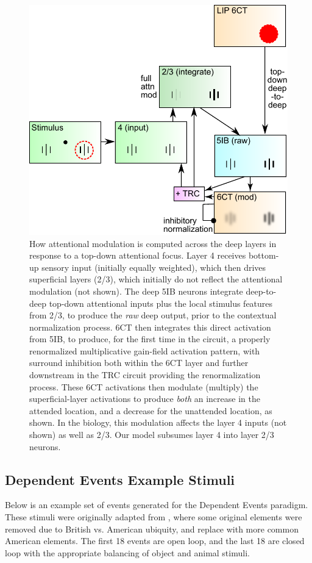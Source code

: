 \documentclass[11pt, titlepage, twoside]{article}
\begin{document}
\begin{figure}
  \centering\includegraphics[width=.75\textwidth]{figs/fig_deepleabra_attn_compute.pdf}
  \caption[Signal Flow Through Cortical Layers in Deep LEABRA]{\small How attentional modulation is computed across the deep layers in response to a top-down attentional focus.  Layer 4 receives bottom-up sensory input (initially equally weighted), which then drives superficial layers (2/3), which initially do not reflect the attentional modulation (not shown).  The deep 5IB neurons integrate deep-to-deep top-down attentional inputs plus the local stimulus features from 2/3, to produce the {\em raw} deep output, prior to the contextual normalization process.  6CT then integrates this direct activation from 5IB, to produce, for the first time in the circuit, a properly renormalized multiplicative gain-field activation pattern, with surround inhibition both within the 6CT layer and further downstream in the  TRC circuit providing the renormalization process.  These 6CT activations then modulate (multiply) the superficial-layer activations to produce {\em both} an increase in the attended location, and a decrease for the unattended location, as shown.  In the biology, this modulation affects the layer 4 inputs (not shown) as well as 2/3.  Our model subsumes layer 4 into layer 2/3 neurons.}
  \label{fig:attn_compute}
\end{figure}

\subsection{Dependent Events Example Stimuli}
\label{appStimuli}

Below is an example set of events generated for the Dependent Events paradigm.  These stimuli were originally adapted from \textcite{HornerBisbyBushEtAl15}, where some original elements were removed due to British vs. American ubiquity, and replace with more common American elements.  The first 18 events are open loop, and the last 18 are closed loop with the appropriate balancing of object and animal stimuli.  
\end{document}
